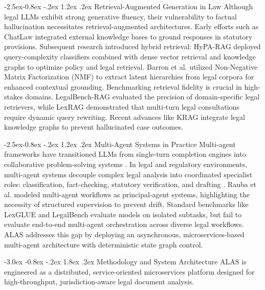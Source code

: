 \documentclass[3p,times,procedia]{elsarticle}
\makeatletter
\renewcommand\section{\@startsection {section}{1}{\z@}%
                                   {-3.0ex \@plus -0.8ex \@minus -.2ex}%
                                   {1.8ex \@plus.2ex}%
                                   {\fontsize{10}{12}\selectfont\bfseries\scshape}}
\renewcommand\subsection{\@startsection{subsection}{2}{\z@}%
                                     {-2.5ex\@plus -0.8ex \@minus -.2ex}%
                                     {1.2ex \@plus .2ex}%
                                     {\fontsize{10}{12}\selectfont\itshape}}
\makeatother
\begin{document}
\subsection{Retrieval-Augmented Generation in Law}
Although legal LLMs exhibit strong generative fluency, their vulnerability to factual hallucination necessitates retrieval-augmented architectures. Early efforts such as ChatLaw \cite{cui2023chatlaw} integrated external knowledge bases to ground responses in statutory provisions. Subsequent research introduced hybrid retrieval: HyPA-RAG \cite{kalra2024hypa} deployed query-complexity classifiers combined with dense vector retrieval and knowledge graphs to optimize policy and legal retrieval. Barron et al. \cite{barron2025bridging} utilized Non-Negative Matrix Factorization (NMF) to extract latent hierarchies from legal corpora for enhanced contextual grounding. Benchmarking retrieval fidelity is crucial in high-stakes domains. LegalBench-RAG \cite{pipitone2024legalbench} evaluated the precision of domain-specific legal retrievers, while LexRAG \cite{li2025lexrag} demonstrated that multi-turn legal consultations require dynamic query rewriting. Recent advances like KRAG \cite{thanh2024krag} integrate legal knowledge graphs to prevent hallucinated case outcomes.

\subsection{Multi-Agent Systems in Practice}
Multi-agent frameworks have transitioned LLMs from single-turn completion engines into collaborative problem-solving systems \cite{xi2023rise}. In legal and regulatory environments, multi-agent systems decouple complex legal analysis into coordinated specialist roles: classification, fact-checking, statutory verification, and drafting \cite{wang2024agent}. Rauba et al. \cite{rauba2026multi} modeled multi-agent workflows as principal-agent systems, highlighting the necessity of structured supervision to prevent drift. Standard benchmarks like LexGLUE \cite{chalkidis2022lexglue} and LegalBench \cite{guha2023legalbench} evaluate models on isolated subtasks, but fail to evaluate end-to-end multi-agent orchestration across diverse legal workflows. ALAS addresses this gap by deploying an asynchronous, microservices-based multi-agent architecture with deterministic state graph control.

\section{Methodology and System Architecture}
ALAS is engineered as a distributed, service-oriented microservices platform designed for high-throughput, jurisdiction-aware legal document analysis.
\end{document}
